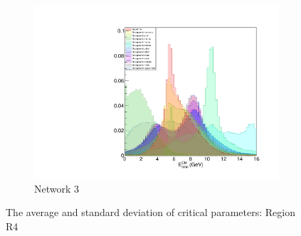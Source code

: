 \documentclass[12pt]{thesis}  %
\begin{document}
\begin{figure}
\begin{subfigure}[b]{0.475\textwidth}
            \includegraphics[width=\textwidth]{images/test.pdf}
            \caption[]%
            {{\small Network 3}}    
            \label{fig:mean and std of net34}
        \end{subfigure}
                \caption[ The average and standard deviation of critical parameters ]
        {\small The average and standard deviation of critical parameters: Region R4} 
    \end{figure}
\end{document}
